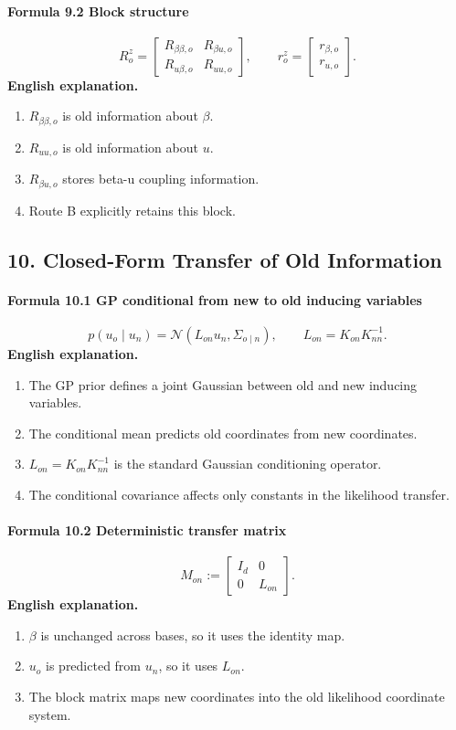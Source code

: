 \documentclass[12pt]{article}
\begin{document}
\paragraph{Formula 9.2 Block structure}
\[
R_o^z=
\begin{bmatrix}
R_{\beta\beta,o}&R_{\beta u,o}\\
R_{u\beta,o}&R_{uu,o}
\end{bmatrix},
\qquad
r_o^z=
\begin{bmatrix}
r_{\beta,o}\\r_{u,o}
\end{bmatrix}.
\]
\textbf{English explanation.}
\begin{enumerate}[leftmargin=2em]
\item \(R_{\beta\beta,o}\) is old information about \(\beta\).
\item \(R_{uu,o}\) is old information about \(u\).
\item \(R_{\beta u,o}\) stores beta-u coupling information.
\item Route B explicitly retains this block.
\end{enumerate}

\subsection{10. Closed-Form Transfer of Old Information}
\paragraph{Formula 10.1 GP conditional from new to old inducing variables}
\[
p(u_o\mid u_n)=\mathcal N(L_{on}u_n,\Sigma_{o\mid n}),
\qquad
L_{on}=K_{on}K_{nn}^{-1}.
\]
\textbf{English explanation.}
\begin{enumerate}[leftmargin=2em]
\item The GP prior defines a joint Gaussian between old and new inducing variables.
\item The conditional mean predicts old coordinates from new coordinates.
\item \(L_{on}=K_{on}K_{nn}^{-1}\) is the standard Gaussian conditioning operator.
\item The conditional covariance affects only constants in the likelihood transfer.
\end{enumerate}

\paragraph{Formula 10.2 Deterministic transfer matrix}
\[
M_{on}:=
\begin{bmatrix}
I_d&0\\
0&L_{on}
\end{bmatrix}.
\]
\textbf{English explanation.}
\begin{enumerate}[leftmargin=2em]
\item \(\beta\) is unchanged across bases, so it uses the identity map.
\item \(u_o\) is predicted from \(u_n\), so it uses \(L_{on}\).
\item The block matrix maps new coordinates into the old likelihood coordinate system.
\end{enumerate}
\end{document}
